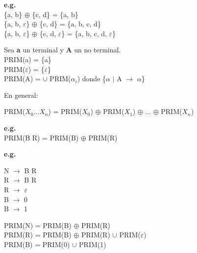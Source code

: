 \documentclass[\main/ApuntesPL.tex]{subfiles}
\begin{document}
    \par
    \textbf{e.g.}\\
    \hspace{5mm}\{a, b\} $\oplus$ \{c, d\} = \{a, b\}\\
    \hspace{5mm}\{a, b, $\varepsilon$\} $\oplus$ \{c, d\} = \{a, b, c, d\}\\
    \hspace{5mm}\{a, b, $\varepsilon$\} $\oplus$ \{c, d, $\varepsilon$\} = \{a, b, c, d,
      $\varepsilon$\}

    \bigskip
    \par
    Sea \textbf{a} un terminal y \textbf{A} un no terminal.\\
    \hspace{5mm}PRIM(a) = \{a\}\\
    \hspace{5mm}PRIM($\varepsilon$) = \{$\varepsilon$\}\\
    \hspace{5mm}PRIM(A) = $\cup$ PRIM($\alpha_i$) \hspace{5mm}donde \{$\alpha$ $\mid$ A
      $\rightarrow$ $\alpha$\}\\

    \bigskip
    \par
    En general:\\
    \begin{center}
      \large
      PRIM($X_0$...$X_n$) = PRIM($X_0$) $\oplus$ PRIM($X_1$) $\oplus$ ... $\oplus$ PRIM($X_n$)
    \end{center}

    \par
    \textbf{e.g.}\\
    \hspace{5mm}PRIM(B R) = PRIM(B) $\oplus$ PRIM(R)

    \bigskip
    \par
    \textbf{e.g.}\\
    \begin{center}
      \begin{minipage}{.3\textwidth}
        \hspace*{5mm}N $\rightarrow$ B R\\
        \hspace*{5mm}R $\rightarrow$ B R\\
        \hspace*{5mm}R $\rightarrow$ $\varepsilon$\\
        \hspace*{5mm}B $\rightarrow$ 0\\
        \hspace*{5mm}B $\rightarrow$ 1
      \end{minipage}%
      \begin{minipage}{.7\textwidth}
        PRIM(N) = PRIM(B) $\oplus$ PRIM(R)\\
        PRIM(R) = PRIM(B) $\oplus$ PRIM(R) $\cup$ PRIM($\varepsilon$)\\
        PRIM(B) = PRIM(0) $\cup$ PRIM(1)
      \end{minipage}
    \end{center}
\end{document}
